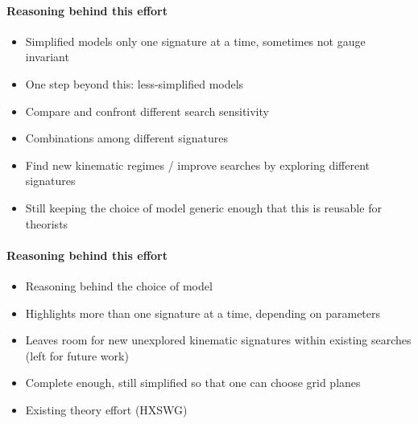 \paragraph{Reasoning behind this effort}

\begin{itemize}
\item Simplified models only one signature at a time, sometimes not
gauge invariant
\item One step beyond this: less-simplified models

\item Compare and confront different search sensitivity

\item Combinations among different signatures

\item Find new kinematic regimes / improve searches by exploring
different signatures

\item Still keeping the choice of model generic enough that this is reusable
for theorists

\end{itemize}

\paragraph{Reasoning behind this effort}

\begin{itemize}

\item Reasoning behind the choice of model

\item Highlights more than one signature at a time, depending on
parameters

\item Leaves room for new unexplored kinematic signatures within
existing searches (left for future work)

\item Complete enough, still simplified so that one can choose grid
planes

\item Existing theory effort (HXSWG)
\end{itemize}
